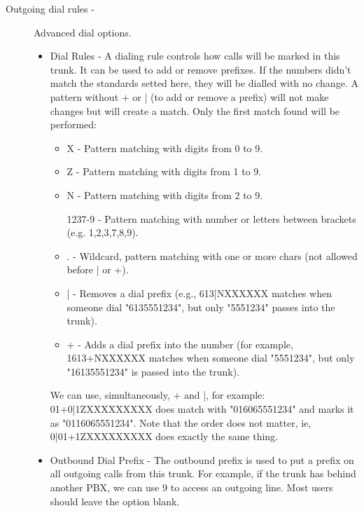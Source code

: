 \begin{description}
\begin{description}
            \item[Outgoing dial rules -] Advanced dial options.
                \begin{itemize}
                    \item Dial Rules - A dialing rule controls how calls will be marked in this trunk. It can be used to add or remove prefixes. If the numbers didn't match the standards setted here, they will be dialled with no change. A pattern without + or | (to add or remove a prefix) will not make changes but will create a match. Only the first match found will be performed:
                        \begin{itemize}
                            \item X - Pattern matching with digits from 0 to 9.
                            \item Z - Pattern matching with digits from 1 to 9.
                            \item N - Pattern matching with digits from 2 to 9.
                            \item [1237-9] - Pattern matching with number or letters between brackets (e.g. 1,2,3,7,8,9).
                            \item . - Wildcard, pattern matching with one or more chars (not allowed before | or +).
                            \item | - Removes a dial prefix (e.g., 613|NXXXXXX matches when someone dial "6135551234", but only "5551234" passes into the trunk).
                            \item + - Adds a dial prefix into the number (for example, 1613+NXXXXXX matches when someone dial "5551234", but only "16135551234" is passed into the trunk).
                        \end{itemize}
                        We can use, simultaneously, + and |, for example: 01+0|1ZXXXXXXXXX does match with "016065551234" and marks it as "0116065551234". Note that the order does not matter, ie, 0|01+1ZXXXXXXXXX does exactly the same thing.
                    \item Outbound Dial Prefix - The outbound prefix is used to put a prefix on all outgoing calls from this trunk. For example, if the trunk has behind another PBX, we can use 9 to access an outgoing line. Most users should leave the option blank.
                \end{itemize}
        \end{description}
\end{description}


